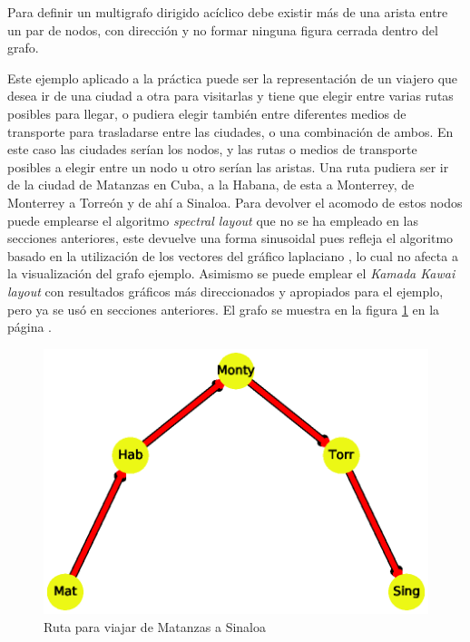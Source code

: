 \documentclass{article}
\begin{document}
Para definir un multigrafo dirigido acíclico debe existir más de una arista entre un par de nodos, con dirección y no formar ninguna figura cerrada dentro del grafo. 

Este ejemplo aplicado a la práctica puede ser la representación de un viajero que desea ir de una ciudad a otra para visitarlas y tiene que elegir entre varias rutas posibles para llegar, o pudiera elegir también entre diferentes medios de transporte para trasladarse entre las ciudades, o una combinación de ambos. En este caso las ciudades serían los nodos, y las rutas o medios de transporte posibles a elegir entre un nodo u otro serían las aristas. Una ruta pudiera ser ir de la ciudad de Matanzas en Cuba, a la Habana, de esta a Monterrey, de Monterrey a Torreón y de ahí a Sinaloa. Para devolver el acomodo de estos  nodos puede emplearse el algoritmo \textit{spectral layout} que no se ha empleado en las secciones anteriores, este devuelve una forma sinusoidal pues refleja el algoritmo basado en la utilización de los vectores del gráfico laplaciano \citep{layout}, lo cual no afecta a la visualización del grafo ejemplo. Asimismo se puede emplear el \textit{Kamada Kawai layout} con resultados gráficos más direccionados y apropiados para el ejemplo, pero ya se usó en secciones anteriores. El grafo se muestra en la figura \ref{fig:Fig10} en la página \pageref{fig:Fig10}. 



\begin{figure}[htbp]
    \centering
    \includegraphics[scale=0.6]{imagenes1/Fig10.eps}
    \caption{Ruta para viajar de Matanzas a Sinaloa}
    \label{fig:Fig10}
\end{figure}
\end{document}

